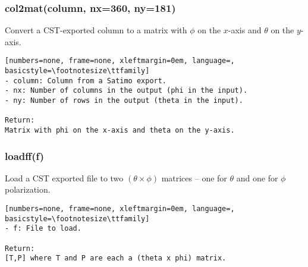 \subsubsection{col2mat(column, nx=360, ny=181)}
Convert a CST-exported column to a matrix with $\phi$ on the 
$x$-axis and $\theta$ on the $y$-axis.

\begin{lstlisting}[numbers=none, frame=none, xleftmargin=0em, language=, basicstyle=\footnotesize\ttfamily]
- column: Column from a Satimo export.
- nx: Number of columns in the output (phi in the input).
- ny: Number of rows in the output (theta in the input).

Return:
Matrix with phi on the x-axis and theta on the y-axis.
\end{lstlisting}

\subsubsection{loadff(f)}
Load a CST exported file to two $(\theta \times \phi)$ matrices -- one for
$\theta$ and one for $\phi$ polarization.

\begin{lstlisting}[numbers=none, frame=none, xleftmargin=0em, language=, basicstyle=\footnotesize\ttfamily]
- f: File to load.

Return:
[T,P] where T and P are each a (theta x phi) matrix.
\end{lstlisting}


